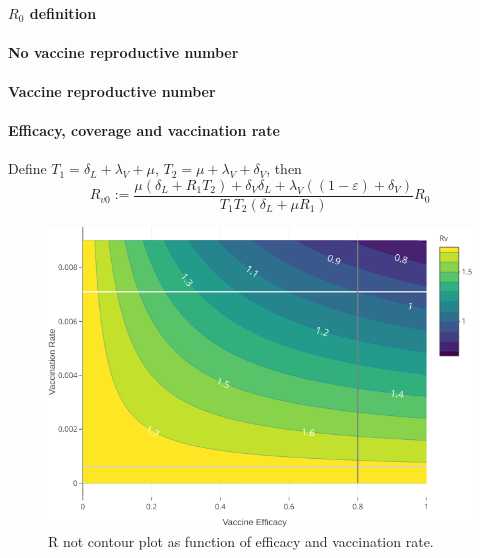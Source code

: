 \paragraph{$R_0$ definition}
\paragraph{No  vaccine reproductive number}
\paragraph{Vaccine reproductive number}
\paragraph{Efficacy, coverage and vaccination rate}



Define $T_1 = \delta_L+\lambda_V+\mu$, 
$T_2= \mu+\lambda_V+\delta_V$, then 
\begin{equation*}
 R_{v0} := \frac{\mu(\delta_{L}+R_1T_2)+
 \delta_V\delta_L+\lambda_V((1-\varepsilon)+\delta_V)}
 {T_1T_2(\delta_L+\mu R_1)}R_0
\end{equation*}
\begin{figure}[tbh]
    \centering
    \includegraphics[scale=2.1, keepaspectratio]{Figures/R0_contour_1}
    \caption{R not contour plot as function of efficacy and vaccination rate.}
    \label{fig:r0contour1}
\end{figure}


